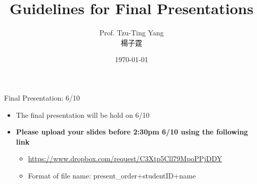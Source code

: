 \documentclass[dvipsnames,hyperref={pdfpagelabels=false}]{beamer}
\title[]  
{Guidelines for Final Presentations}
\author 
{Prof. Tzu-Ting Yang  \\ 楊子霆}
\institute{Institute of Economics, Academia Sinica  \\ 中央研究院經濟研究所}
\date
{\today}
\begin{document}
\begin{frame}{}
 \titlepage
\end{frame}


\begin{frame}{Final Presentation: 6/10}
	\begin{itemize}
		
		\item The final presentation will be hold on 6/10
		\vspace{0.2cm} 
%				
	   \item \textbf{Please upload your slides before 2:30pm 6/10  using the following link}
	   \vspace{0.2cm}
	   \begin{itemize}
	   	\item \url{https://www.dropbox.com/request/C3Xtp5Cll79MpoPPjDDY}
	   	\vspace{0.2cm}
	   	\item Format of file name: present\_order+studentID+name

\end{itemize}
\end{itemize}
\end{frame}
\end{document}
